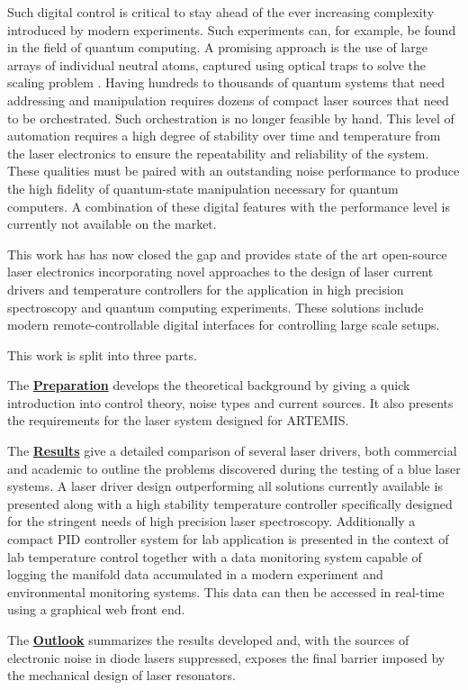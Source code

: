 Such digital control is critical to stay ahead of the ever increasing complexity introduced by modern experiments. Such experiments can, for example, be found in the field of quantum computing. A promising approach is the use of large arrays of individual neutral atoms, captured using optical traps to solve the scaling problem \cite{quatum_computer_scaling_ions}. Having hundreds to thousands of quantum systems that need addressing and manipulation requires dozens of compact laser sources that need to be orchestrated. Such orchestration is no longer feasible by hand. This level of automation requires a high degree of stability over time and temperature from the laser electronics to ensure the repeatability and reliability of the system. These qualities must be paired with an outstanding noise performance to produce the high fidelity of quantum-state manipulation necessary for quantum computers. A combination of these digital features with the performance level is currently not available on the market.

This work has has now closed the gap and provides state of the art open-source laser electronics incorporating novel approaches to the design of laser current drivers and temperature controllers for the application in high precision spectroscopy and quantum computing experiments. These solutions include modern remote-controllable digital interfaces for controlling large scale setups.

This work is split into three parts. \par\vspace{12pt}

The \hyperref[sec:preparation]{\textbf{Preparation}} develops the theoretical background by giving a quick introduction into control theory, noise types and current sources. It also presents the requirements for the laser system designed for ARTEMIS.\par\vspace{12pt}

The \hyperref[sec:results]{\textbf{Results}} give a detailed comparison of several laser drivers, both commercial and academic to outline the problems discovered during the testing of a blue laser systems. A laser driver design outperforming all solutions currently available is presented along with a high stability temperature controller specifically designed for the stringent needs of high precision laser spectroscopy. Additionally a compact PID controller system for lab application is presented in the context of lab temperature control together with a data monitoring system capable of logging the manifold data accumulated in a modern experiment and environmental monitoring systems. This data can then be accessed in real-time using a graphical web front end. \par\vspace{12pt}

The \hyperref[sec:outlook]{\textbf{Outlook}} summarizes the results developed and, with the sources of electronic noise in diode lasers suppressed, exposes the final barrier imposed by the mechanical design of laser resonators.
